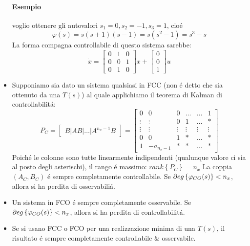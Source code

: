 \documentclass[../main.tex]{subfiles}
\begin{document}
\begin{itemize}
\begin{mdframed}[style=Esempio]
					\paragraph{Esempio} voglio ottenere gli autovalori $ s_1 = 0, s_2 = -1, s_3 = 1 $, cio\'e
						\[
							\varphi(s) = s(s+1)(s-1) = s(s^2-1) = s^3 - s
						\]
						La forma compagna controllabile di questo sistema sarebbe:
						\[
							\dot x =
							\begin{bmatrix}
								0 & 1 & 0\\
								0 & 0 & 1\\
								0 & 1 & 0
							\end{bmatrix} x+
							\begin{bmatrix}
								0\\
								0\\
								1
							\end{bmatrix} u
						\]
				\end{mdframed}
			\item 
				Supponiamo sia dato un sistema qualsiasi in FCC (non \'e detto che sia ottenuto da una $ T(s) $) al quale applichiamo il teorema di Kalman di controllabilit\'a:
				\[
					P_C =
					\begin{bmatrix}
						B | AB | \dots | A^{n_x-1}B
					\end{bmatrix} =
					\begin{bmatrix}
						0 		& 0 		& 0 		& \dots 	& \dots 	& 1\\
						\vdots 	& \vdots 	& 0			& 1 		& \dots		& *\\
						\vdots 	& \vdots	& \vdots	& \vdots	& \vdots	& \vdots\\
						0 		& 0 		& 1 		& *		 	& \dots 	& *\\
						1 		& -a_{n_x-1} & * 		& * 	& \dots		& *
					\end{bmatrix}
				\]
				Poich\'e le colonne sono tutte linearmente indipendenti (qualunque valore ci sia al posto degli asterischi), il rango \'e massimo: $ rank \left\lbrace P_C \right\rbrace = n_x $ 
				La coppia $ (A_C, B_C) $ \'e sempre completamente controllabile. Se $ \partial eg \left\lbrace \varphi_{CO}(s) \right\rbrace < n_x $, allora si ha perdita di osservabili\'a.
			\item 
				Un sistema in FCO \'e sempre completamente osservabile. Se  $ \partial eg \left\lbrace \varphi_{CO}(s) \right\rbrace < n_x $, allora si ha perdita di controllabilit\'a.
			\item 
				Se si usano FCC o FCO per una realizzazione minima di una $ T(s) $, il risultato \'e sempre completamente controllabile \& osservabile.
				

\end{itemize}
\end{document}
